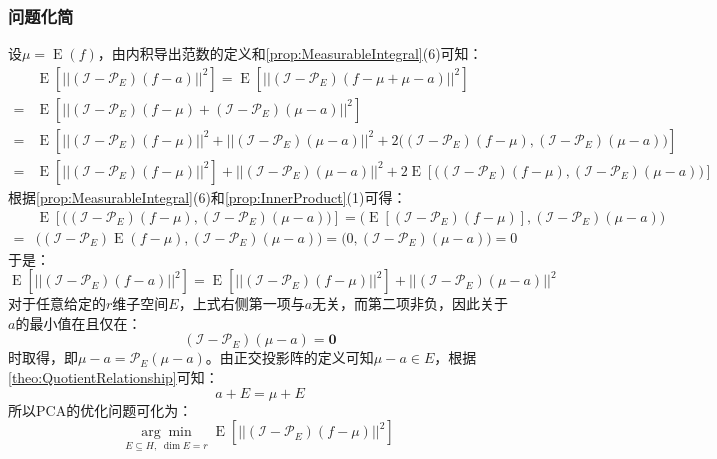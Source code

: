 \subsubsection{问题化简}
设$\mu=\operatorname{E}(f)$，由内积导出范数的定义和\cref{prop:MeasurableIntegral}(6)可知：
\begin{align*}
	&\operatorname{E}[||(\mathcal{I}-\mathcal{P}_E)(f-a)||^2]=\operatorname{E}[||(\mathcal{I}-\mathcal{P}_E)(f-\mu+\mu-a)||^2] \\
	=&\operatorname{E}[||(\mathcal{I}-\mathcal{P}_E)(f-\mu)+(\mathcal{I}-\mathcal{P}_E)(\mu-a)||^2] \\
	=&\operatorname{E}\left[||(\mathcal{I}-\mathcal{P}_E)(f-\mu)||^2+||(\mathcal{I}-\mathcal{P}_E)(\mu-a)||^2+2\Big((\mathcal{I}-\mathcal{P}_E)(f-\mu),(\mathcal{I}-\mathcal{P}_E)(\mu-a)\Big)\right] \\
	=&\operatorname{E}[||(\mathcal{I}-\mathcal{P}_E)(f-\mu)||^2]+||(\mathcal{I}-\mathcal{P}_E)(\mu-a)||^2+2\operatorname{E}\left[\Big((\mathcal{I}-\mathcal{P}_E)(f-\mu),(\mathcal{I}-\mathcal{P}_E)(\mu-a)\Big)\right]
\end{align*}
根据\cref{prop:MeasurableIntegral}(6)和\cref{prop:InnerProduct}(1)可得：
\begin{align*}
	&\operatorname{E}\left[\Big((\mathcal{I}-\mathcal{P}_E)(f-\mu),(\mathcal{I}-\mathcal{P}_E)(\mu-a)\Big)\right]=\Big(\operatorname{E}[(\mathcal{I}-\mathcal{P}_E)(f-\mu)],(\mathcal{I}-\mathcal{P}_E)(\mu-a)\Big) \\
	=&\Big((\mathcal{I}-\mathcal{P}_E)\operatorname{E}(f-\mu),(\mathcal{I}-\mathcal{P}_E)(\mu-a)\Big)=\Big(0,(\mathcal{I}-\mathcal{P}_E)(\mu-a)\Big)=0
\end{align*}
于是：
\begin{equation*}
	\operatorname{E}[||(\mathcal{I}-\mathcal{P}_E)(f-a)||^2]=\operatorname{E}[||(\mathcal{I}-\mathcal{P}_E)(f-\mu)||^2]+||(\mathcal{I}-\mathcal{P}_E)(\mu-a)||^2
\end{equation*}
对于任意给定的$r$维子空间$E$，上式右侧第一项与$a$无关，而第二项非负，因此关于$a$的最小值在且仅在：
\begin{equation*}
	(\mathcal{I}-\mathcal{P}_E)(\mu-a)=\mathbf{0}
\end{equation*}
时取得，即$\mu-a=\mathcal{P}_E(\mu-a)$。由正交投影阵的定义可知$\mu-a\in E$，根据\cref{theo:QuotientRelationship}可知：
\begin{equation*}
	a+E=\mu+E
\end{equation*}
所以PCA的优化问题可化为：
\begin{equation*}
	\underset{E\subseteq H,\;\dim E=r}{\arg\min}\;\operatorname{E}[||(\mathcal{I}-\mathcal{P}_E)(f-\mu)||^2]
\end{equation*}\par

